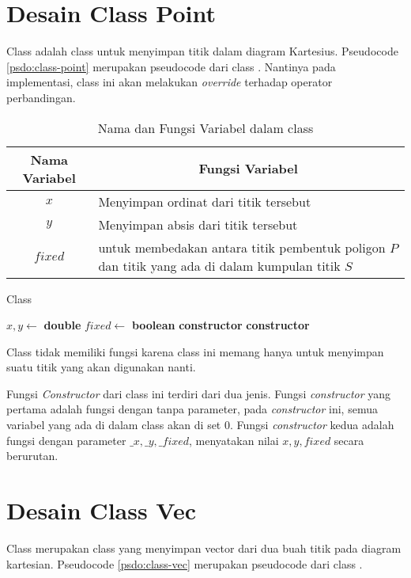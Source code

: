\section{Desain Class Point}
\label{sec:point}
Class  adalah class untuk menyimpan titik dalam diagram Kartesius. Pseudocode \ref{psdo:class-point} merupakan pseudocode dari class . Nantinya pada implementasi, class ini akan melakukan \textit{override} terhadap operator perbandingan.
\begin{table}[]
	\Centering
	\begin{tabular}{|c|p{7cm}|}
	\hline
	Nama Variabel & \multicolumn{1}{c|}{Fungsi Variabel}                               \\ \hline
$x$           & Menyimpan ordinat dari titik tersebut  \\ \hline
$y$           & Menyimpan absis dari titik tersebut          \\ \hline
$fixed$             & untuk membedakan antara titik pembentuk poligon $P$ dan titik yang ada di dalam kumpulan titik $S$   \\ \hline
	\end{tabular}
	\caption{Nama dan Fungsi Variabel dalam class }
	\label{tab:var-point}
\end{table}
\begin{algorithm}
	\caption{Class }
	\label{psdo:class-point}
	\begin{algorithmic}[1]
        \State $ x, y \leftarrow $ \textbf{double}
        \State $fixed \leftarrow $ \textbf{boolean}
		\State \textbf{constructor} 
        \State \textbf{constructor} 
	\end{algorithmic}
\end{algorithm}

Class  tidak memiliki fungsi karena class ini memang hanya untuk menyimpan suatu titik yang akan digunakan nanti.

Fungsi \textit{Constructor} dari class ini terdiri dari dua jenis. Fungsi \textit{constructor} yang pertama adalah fungsi dengan tanpa parameter, pada \textit{constructor} ini, semua variabel yang ada di dalam class  akan di set $0$. Fungsi \textit{constructor} kedua adalah fungsi dengan parameter $\_x, \_y, \_fixed$, menyatakan nilai $x, y, fixed$ secara berurutan.

\section{Desain Class Vec}
Class  merupakan class yang menyimpan vector dari dua buah titik pada diagram kartesian. Pseudocode \ref{psdo:class-vec} merupakan pseudocode dari class . 

